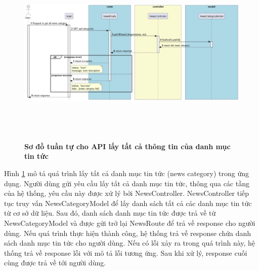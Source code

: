 \begin{figure}[H]
  \centering
  \includegraphics[width=16cm,height=9cm]{Images/server/sequence/server/getAllNewsCategories.png}
  \caption[Sơ đồ tuần tự cho API lấy tất cả thông tin của danh mục tin tức ]{\bfseries \fontsize{12pt}{0pt}
  \selectfont Sơ đồ tuần tự cho API lấy tất cả thông tin của danh mục tin tức }
  \label{getAllNewsCategories} %
\end{figure}
Hình \ref{getAllNewsCategories} mô tả quá trình lấy tất cả danh mục tin tức (news category) trong ứng dụng. Người dùng gửi yêu cầu lấy tất cả danh mục tin tức, thông qua các tầng của hệ thống, yêu cầu này được xử lý bởi NewsController. NewsController tiếp tục truy vấn NewsCategoryModel để lấy danh sách tất cả các danh mục tin tức từ cơ sở dữ liệu. Sau đó, danh sách danh mục tin tức được trả về từ NewsCategoryModel và được gửi trở lại NewsRoute để trả về response cho người dùng. Nếu quá trình thực hiện thành công, hệ thống trả về response chứa danh sách danh mục tin tức cho người dùng. Nếu có lỗi xảy ra trong quá trình này, hệ thống trả về response lỗi với mô tả lỗi tương ứng. Sau khi xử lý, response cuối cùng được trả về tới người dùng.

